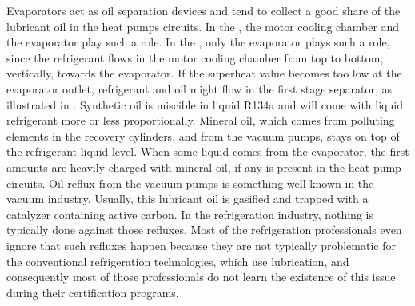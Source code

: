 Evaporators act as oil separation devices and tend to collect a good
share of the lubricant oil in the heat pumps circuits. In the \AWP{},
the motor cooling chamber and the evaporator play such a role. In the
\BWP{}, only the evaporator plays such a role, since the refrigerant
flows in the \BWP{} motor cooling chamber from top to bottom,
vertically, towards the evaporator. If the superheat value becomes too
low at the evaporator outlet, refrigerant and oil might flow in the
first stage separator, as illustrated in
. Synthetic oil is miscible in liquid
R134a and will come with liquid refrigerant more or less
proportionally. Mineral oil, which comes from polluting elements in
the recovery cylinders, and from the vacuum pumps, stays on top of the
refrigerant liquid level. When some liquid comes from the evaporator,
the first amounts are heavily charged with mineral oil, if any is
present in the heat pump circuits. Oil reflux from the vacuum pumps is
something well known in the vacuum industry. Usually, this lubricant
oil is gasified and trapped with a catalyzer containing active
carbon. In the refrigeration industry, nothing is typically done
against those refluxes. Most of the refrigeration professionals even
ignore that such refluxes happen because they are not typically
problematic for the conventional refrigeration technologies, which use
lubrication, and consequently most of those professionals do not learn
the existence of this issue during their certification programs.

\FloatBarrier



\label{sec:bwp-refs}
